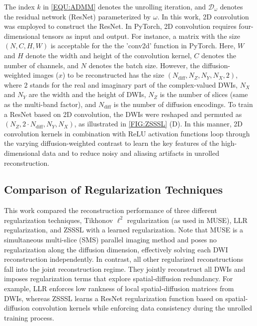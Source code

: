 \documentclass[journal,twoside,web]{ieeecolor}
\begin{document}
	The index $k$ in \cref{EQU:ADMM} denotes the unrolling iteration,
	and $\mathcal{D}_{\omega}$ denotes the residual network (ResNet) \cite{he_2016_resnet}
	parameterized by $\omega$.
	In this work, 2D convolution was employed to construct the ResNet.
	In PyTorch, 2D convolution requires four-dimensional tensors as input and output.
	For instance, a matrix with the size $(N, C, H, W)$ is acceptable
	for the the 'conv2d' function in PyTorch.
	Here, $W$ and $H$ denote the width and height of the convolution kernel,
	$C$ denotes the number of channels, and $N$ denotes the batch size.
	However, the diffusion-weighted images ($x$) to be reconstructed
	has the size $(N_{\text{diff}}, N_Z, N_Y, N_X, 2)$,
	where $2$ stands for the real and imaginary part of the complex-valued DWIs,
	$N_X$ and $N_Y$ are the width and the height of DWIs,
	$N_Z$ is the number of slices (same as the multi-band factor), and
	$N_{\text{diff}}$ is the number of diffusion encodings.
	To train a ResNet based on 2D convolution, the DWIs were reshaped and permuted
	as $(N_Z, 2 \cdot N_{\text{diff}}, N_Y, N_X)$, as illustrated in \cref{FIG:ZSSSL} (D).
	In this manner, 2D convolution kernels in combination with ReLU activation functions
	loop through the varying diffusion-weighted contrast
	to learn the key features of the high-dimensional data and
	to reduce noisy and aliasing artifacts in unrolled reconstruction.

	\subsection{Comparison of Regularization Techniques}

	This work compared the reconstruction performance
	of three different regularization techniques,
	Tikhonov $\ell^2$ regularization (as used in MUSE),
	LLR regularization,
	and ZSSSL with a learned regularization.
	Note that MUSE is a simultaneous multi-slice (SMS) parallel imaging method
	and poses no regularization along the diffusion dimension,
	effectively solving each DWI reconstruction independently.
	In contrast, all other regularized reconstructions
	fall into the joint reconstruction regime.
	They jointly reconstruct all DWIs
	and imposes regularization terms that explore spatial-diffusion redundancy.
	For example, LLR enforces low rankness of
	local spatial-diffusion matrices from DWIs,
	whereas ZSSSL learns a ResNet regularization function
	based on spatial-diffusion convolution kernels
	while enforcing data consistency during the unrolled training process.
\end{document}
